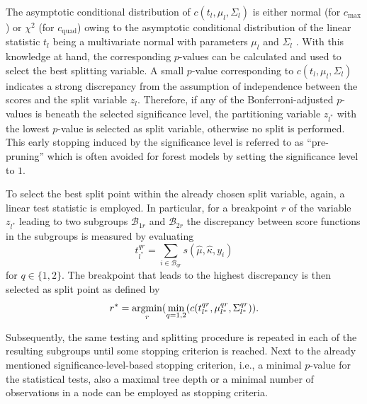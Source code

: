 \documentclass{statsoc}
\newcommand{\argmin}{\operatorname{argmin}\displaylimits}
\begin{document}
\begin{appendix}
The asymptotic conditional distribution of $c(t_{l},\mu_{l},\Sigma_{l})$ is
either normal (for $c_{\text{max}}$) or $\chi^2$ (for $c_{\text{quad}}$) owing
to the asymptotic conditional distribution of the linear statistic $t_l$ being
a multivariate normal with parameters $\mu_l$ and $\Sigma_l$
\citep{Strasser+Weber:1999}. With this knowledge at hand, the corresponding
$p$-values can be calculated and used to select the best splitting variable. A
small $p$-value corresponding to $c(t_{l},\mu_{l},\Sigma_{l})$ indicates a
strong discrepancy from the assumption of independence between the scores and
the split variable $z_l$. Therefore, if any of the Bonferroni-adjusted
$p$-values is beneath the selected significance level, the partitioning
variable $z_{l^\ast}$ with the lowest $p$-value is selected as split variable,
otherwise no split is performed. This early stopping induced by the
significance level is referred to as ``pre-pruning'' which is often avoided for
forest models by setting the significance level to $1$.

To select the best split point within the already chosen split variable, again,
a linear test statistic is employed. In particular, for a breakpoint $r$ of the
variable $z_{l^{\ast}}$ leading to two subgroups $\mathcal{B}_{1r}$ and
$\mathcal{B}_{2r}$ the discrepancy between score functions in the subgroups is
measured by evaluating
\begin{equation}
t_{l^{\ast}}^{qr} = \sum_{i \in \mathcal{B}_{qr}} s(\hat{\mu}, \hat{\kappa}, y_i)
\end{equation}
for $q \in \{1,2\}$. The breakpoint that leads to the highest discrepancy is
then selected as split point as defined by
\begin{equation}
r^{\ast} = \argmin_{r} (\min_{q=1,2}(c(t_{l^{\ast}}^{qr},\mu_{l^{\ast}}^{qr},\Sigma_{l^{\ast}}^{qr})).
\end{equation}

Subsequently, the same testing and splitting procedure is repeated in each of
the resulting subgroups until some stopping criterion is reached. Next to the
already mentioned significance-level-based stopping criterion, i.e., a minimal
$p$-value for the statistical tests, also a maximal tree depth or a minimal
number of observations in a node can be employed as stopping criteria.



\end{appendix}
\end{document}
